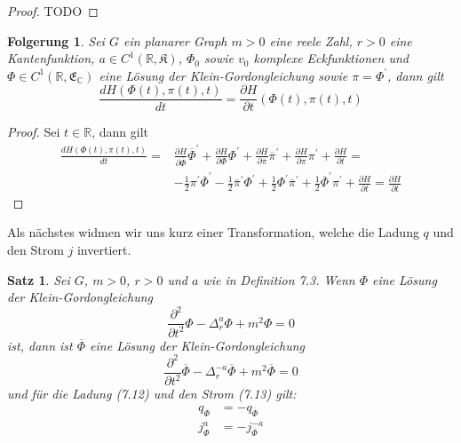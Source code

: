 \documentclass[11pt,a4paper,leqno]{report}
\newtheorem{proposition}{Satz}[chapter]
\newtheorem{corollary}[theorem]{Folgerung}
\numberwithin{equation}{chapter}
\begin{document}
\begin{proof}
TODO
\end{proof}

\begin{corollary}
Sei $G$ ein planarer Graph $m>0$ eine reele Zahl, $r>0$ eine Kantenfunktion, $a\in C^1(\mathbb{R}, \mathfrak{K})$, $\Phi_0$ sowie $v_0$ komplexe Eckfunktionen und $\Phi\in C^1(\mathbb{R}, \mathfrak{E}_\mathbb{C})$ eine L\"osung der Klein-Gordongleichung sowie $\pi=\Phi^\prime$, dann gilt
\begin{equation}
	\frac{dH(\Phi(t), \pi(t),t)}{dt} = \frac{\partial H}{\partial t}(\Phi(t), \pi(t),t)
\end{equation}
\end{corollary}
\begin{proof}
	Sei $t\in\mathbb{R}$, dann gilt
	\begin{align*}
\frac{dH(\Phi(t), \pi(t),t)}{dt}=&\frac{\partial H}{\partial \overline{\Phi}}\overline{\Phi}^\prime + \frac{\partial H}{\partial \Phi}\Phi^\prime +\frac{\partial H}{\partial \overline{\pi}}\overline{\pi}^\prime + \frac{\partial H}{\partial \pi}\pi^\prime + \frac{\partial H}{\partial t}=\\
&-\frac{1}{2}\pi^\prime\overline{\Phi}^\prime  -\frac{1}{2}\overline{\pi}^\prime\Phi^\prime +\frac{1}{2}\Phi^\prime\overline{\pi}^\prime + \frac{1}{2}\overline{\Phi}^\prime\pi^\prime + \frac{\partial H}{\partial t}=\frac{\partial H}{\partial t}
	\end{align*}
\end{proof}
\noindent
Als n\"achstes widmen wir uns kurz einer Transformation, welche die Ladung $q$ und den Strom $j$ invertiert. 
\begin{proposition}
	Sei $G$, $m>0$, $r>0$ und $a$ wie in Definition 7.3. Wenn $\Phi$ eine L\"osung der Klein-Gordongleichung
	\begin{equation}
		\frac{\partial^2}{\partial t^2}\Phi - \Delta^{a}_r\Phi+ m^2 \Phi = 0
	\end{equation}
 ist, dann ist $\overline{\Phi}$ eine L\"osung der Klein-Gordongleichung
 	\begin{equation}
 	\frac{\partial^2}{\partial t^2}\overline{\Phi} - \Delta^{-a}_r\overline{\Phi}+ m^2 \overline{\Phi} = 0
 	\end{equation}
 und f\"ur die Ladung (7.12) und den Strom (7.13) gilt:
 \begin{align}
 	q_\Phi &= - q_{\overline{\Phi}}\\
 	j_\Phi^a &= - j_{\overline{\Phi}}^{-a}
 \end{align}
\end{proposition}
\end{document}
